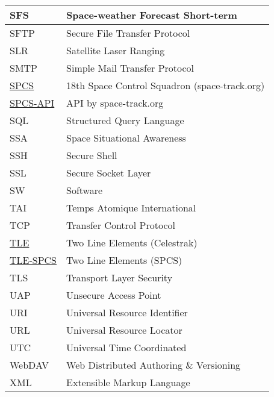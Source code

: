 \documentclass[dec_sum_main.tex]{subfiles}
\begin{document}
\begin{longtable}{|m{2.8cm}|m{10cm}|}
    SFS & Space-weather Forecast Short-term \\ \hline
    SFTP & Secure File Transfer Protocol \\ \hline
	SLR & Satellite Laser Ranging \\ \hline
	SMTP & Simple Mail Transfer Protocol \\ \hline
	\href{https://www.space-track.org/}{SPCS} & 18th Space Control Squadron (space-track.org) \\ \hline
	\href{https://www.space-track.org/documentation#/api}{SPCS-API} & API by space-track.org \\ \hline
	SQL & Structured Query Language \\ \hline
	SSA & Space Situational Awareness \\ \hline
	SSH & Secure Shell \\ \hline
	SSL & Secure Socket Layer \\ \hline
	SW & Software \\ \hline
	TAI & Temps Atomique International \\ \hline
	TCP & Transfer Control Protocol \\ \hline
    \href{https://www.celestrak.com/NORAD/documentation/tle-fmt.php}{TLE} & Two Line Elements (Celestrak)\\ \hline    
	\href{https://www.space-track.org/documentation#tle}{TLE-SPCS} & Two Line Elements (SPCS)\\ \hline
	TLS & Transport Layer Security \\ \hline
	UAP & Unsecure Access Point \\ \hline
    URI & Universal Resource Identifier \\ \hline
	URL & Universal Resource Locator \\ \hline
	UTC & Universal Time Coordinated \\ \hline
	WebDAV & Web Distributed Authoring \& Versioning \\ \hline
	XML & Extensible Markup Language \\ \hline						
\end{longtable}
\end{document}
